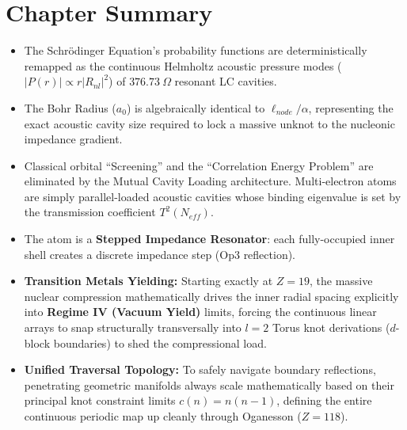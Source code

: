 \section*{Chapter Summary}
\begin{itemize}
    \item The Schrödinger Equation's probability functions are deterministically remapped as the continuous Helmholtz acoustic pressure modes ($|P(r)| \propto r |R_{nl}|^2$) of $376.73\ \Omega$ resonant LC cavities.
    \item The Bohr Radius ($a_0$) is algebraically identical to $\ell_{node}/\alpha$, representing the exact acoustic cavity size required to lock a massive unknot to the nucleonic impedance gradient.
    \item Classical orbital ``Screening'' and the ``Correlation Energy Problem'' are eliminated by the Mutual Cavity Loading architecture. Multi-electron atoms are simply parallel-loaded acoustic cavities whose binding eigenvalue is set by the transmission coefficient $T^2(N_{eff})$.
    \item The atom is a \textbf{Stepped Impedance Resonator}: each fully-occupied inner shell creates a discrete impedance step (Op3 reflection).
    \item \textbf{Transition Metals Yielding:} Starting exactly at $Z=19$, the massive nuclear compression mathematically drives the inner radial spacing explicitly into \textbf{Regime IV (Vacuum Yield)} limits, forcing the continuous linear arrays to snap structurally transversally into $l=2$ Torus knot derivations ($d$-block boundaries) to shed the compressional load.
    \item \textbf{Unified Traversal Topology:} To safely navigate boundary reflections, penetrating geometric manifolds always scale mathematically based on their principal knot constraint limits $c(n) = n(n-1)$, defining the entire continuous periodic map up cleanly through Oganesson ($Z=118$). 
\end{itemize}

